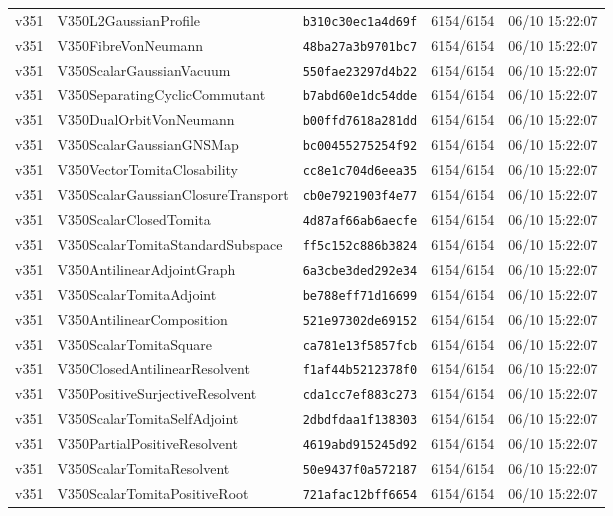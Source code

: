 \documentclass[11pt]{article}
\theoremstyle{definition}\newtheorem{deriv}{Derivation}
\begin{document}
{\begin{longtable}{@{}lllll@{}}
v351 & V350L2GaussianProfile & \texttt{b310c30ec1a4d69f} & 6154/6154 & 06/10 15:22:07 \\
v351 & V350FibreVonNeumann & \texttt{48ba27a3b9701bc7} & 6154/6154 & 06/10 15:22:07 \\
v351 & V350ScalarGaussianVacuum & \texttt{550fae23297d4b22} & 6154/6154 & 06/10 15:22:07 \\
v351 & V350SeparatingCyclicCommutant & \texttt{b7abd60e1dc54dde} & 6154/6154 & 06/10 15:22:07 \\
v351 & V350DualOrbitVonNeumann & \texttt{b00ffd7618a281dd} & 6154/6154 & 06/10 15:22:07 \\
v351 & V350ScalarGaussianGNSMap & \texttt{bc00455275254f92} & 6154/6154 & 06/10 15:22:07 \\
v351 & V350VectorTomitaClosability & \texttt{cc8e1c704d6eea35} & 6154/6154 & 06/10 15:22:07 \\
v351 & V350ScalarGaussianClosureTransport & \texttt{cb0e7921903f4e77} & 6154/6154 & 06/10 15:22:07 \\
v351 & V350ScalarClosedTomita & \texttt{4d87af66ab6aecfe} & 6154/6154 & 06/10 15:22:07 \\
v351 & V350ScalarTomitaStandardSubspace & \texttt{ff5c152c886b3824} & 6154/6154 & 06/10 15:22:07 \\
v351 & V350AntilinearAdjointGraph & \texttt{6a3cbe3ded292e34} & 6154/6154 & 06/10 15:22:07 \\
v351 & V350ScalarTomitaAdjoint & \texttt{be788eff71d16699} & 6154/6154 & 06/10 15:22:07 \\
v351 & V350AntilinearComposition & \texttt{521e97302de69152} & 6154/6154 & 06/10 15:22:07 \\
v351 & V350ScalarTomitaSquare & \texttt{ca781e13f5857fcb} & 6154/6154 & 06/10 15:22:07 \\
v351 & V350ClosedAntilinearResolvent & \texttt{f1af44b5212378f0} & 6154/6154 & 06/10 15:22:07 \\
v351 & V350PositiveSurjectiveResolvent & \texttt{cda1cc7ef883c273} & 6154/6154 & 06/10 15:22:07 \\
v351 & V350ScalarTomitaSelfAdjoint & \texttt{2dbdfdaa1f138303} & 6154/6154 & 06/10 15:22:07 \\
v351 & V350PartialPositiveResolvent & \texttt{4619abd915245d92} & 6154/6154 & 06/10 15:22:07 \\
v351 & V350ScalarTomitaResolvent & \texttt{50e9437f0a572187} & 6154/6154 & 06/10 15:22:07 \\
v351 & V350ScalarTomitaPositiveRoot & \texttt{721afac12bff6654} & 6154/6154 & 06/10 15:22:07 \\

\end{longtable}}
\end{document}
